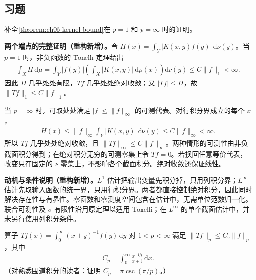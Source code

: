 \documentclass[../../main.tex]{subfiles}
\begin{document}
\subsection*{习题}
\begin{exercise}\label{exercise:ch06-kernel-endpoints}
补全\cref{theorem:ch06-kernel-bound}在 $p=1$ 和 $p=\infty$ 时的证明。
\end{exercise}
\begin{solution}
\textbf{两个端点的完整证明（重构新增）。}令 $H(x)=\int_Y|K(x,y)f(y)|\,\mathrm d\nu(y)$。当 $p=1$ 时，非负函数的 Tonelli 定理给出
\begin{align*}
\int_XH\,\mathrm d\mu
=\int_Y|f(y)|\left(\int_X|K(x,y)|\,\mathrm d\mu(x)\right)\mathrm d\nu(y)
\leqslant C\|f\|_1<\infty.
\end{align*}
因此 $H$ 几乎处处有限，$Tf$ 几乎处处绝对收敛；又 $|Tf|\leqslant H$，故 $\|Tf\|_1\leqslant C\|f\|_1$。

当 $p=\infty$ 时，可取处处满足 $|f|\leqslant\|f\|_\infty$ 的可测代表。对行积分界成立的每个 $x$，
\begin{align*}
H(x)\leqslant\|f\|_\infty\int_Y|K(x,y)|\,\mathrm d\nu(y)
\leqslant C\|f\|_\infty<\infty.
\end{align*}
所以 $Tf$ 几乎处处绝对收敛，且 $\|Tf\|_\infty\leqslant C\|f\|_\infty$。两种情形的可测性由非负截面积分得到；在绝对积分无穷的可测零集上令 $Tf=0$。若换回任意等价代表，改变只在固定的 $\nu$ 零集上，不影响各个截面积分。绝对收敛还保证线性。
\end{solution}
\begin{remark}
\textbf{动机与条件说明（重构新增）。}$L^1$ 估计把输出变量先积分掉，只用列积分界；$L^\infty$ 估计先取输入函数的统一界，只用行积分界。两者都直接控制绝对积分，因此同时解决存在性与有界性。零函数和零测度空间包含在估计中，无需单位范数归一化。联合可测性及 $\sigma$ 有限性沿用原定理以适用 Tonelli；在 $L^\infty$ 的单个截面估计中，并未另行使用列积分条件。
\end{remark}
\begin{exercise}\label{exercise:ch06-hilbert-inequality}
算子 $Tf(x)=\int_0^\infty(x+y)^{-1}f(y)\,\mathrm dy$ 对 $1<p<\infty$ 满足 $\|Tf\|_p\leqslant C_p\|f\|_p$，其中
\begin{align*}
C_p=\int_0^\infty\frac{x^{-1/p}}{x+1}\,\mathrm dx.
\end{align*}
（对熟悉围道积分的读者：证明 $C_p=\pi\csc(\pi/p)$。）
\end{exercise}
\end{document}
